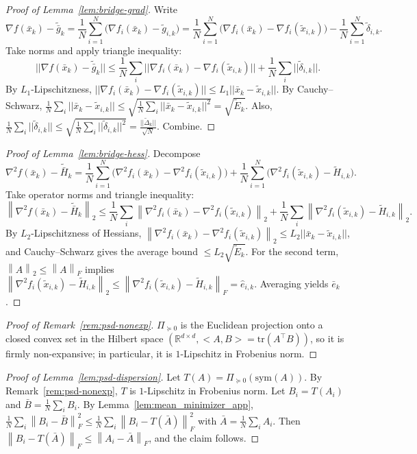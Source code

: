 \documentclass[11pt,a4paper]{article}
\def\norm#1{||#1||}%
\def\ip#1#2{<#1,#2>}%
\newcommand{\R}{\mathbb{R}}
\newcommand{\ip}[2]{\left\langle #1,#2\right\rangle}
\newcommand{\norm}[1]{\left\|#1\right\|}
\newcommand{\normtwo}[1]{\left\|#1\right\|_2}
\newcommand{\normF}[1]{\left\|#1\right\|_F}
\newcommand{\ProjPSD}{\Pi_{\succeq 0}}
\begin{document}
	
	\begin{proof}[Proof of Lemma~\ref{lem:bridge-grad}]
		Write
		\[
		\nabla f(\bar x_k)-\tilde{\bar g}_k
		=\frac1N\sum_{i=1}^N\big(\nabla f_i(\bar x_k)-\tilde g_{i,k}\big)
		=\frac1N\sum_{i=1}^N\big(\nabla f_i(\bar x_k)-\nabla f_i(\tilde x_{i,k})\big)
		-\frac1N\sum_{i=1}^N \tilde\delta_{i,k}.
		\]
		Take norms and apply triangle inequality:
		\[
		\norm{\nabla f(\bar x_k)-\tilde{\bar g}_k}
		\le \frac1N\sum_i\norm{\nabla f_i(\bar x_k)-\nabla f_i(\tilde x_{i,k})}
		+\frac1N\sum_i\norm{\tilde\delta_{i,k}}.
		\]
		By $L_1$-Lipschitzness,
		$\norm{\nabla f_i(\bar x_k)-\nabla f_i(\tilde x_{i,k})}\le L_1\norm{\bar x_k-\tilde x_{i,k}}$.
		By Cauchy--Schwarz,
		$\frac1N\sum_i\norm{\bar x_k-\tilde x_{i,k}}\le \sqrt{\frac1N\sum_i\norm{\bar x_k-\tilde x_{i,k}}^2}=\sqrt{\tilde E_k}$.
		Also,
		$\frac1N\sum_i\norm{\tilde\delta_{i,k}}\le \sqrt{\frac1N\sum_i\norm{\tilde\delta_{i,k}}^2}=\frac{\norm{\tilde\Delta_k}}{\sqrt N}$.
		Combine.
	\end{proof}
	
	\begin{proof}[Proof of Lemma~\ref{lem:bridge-hess}]
		Decompose
		\[
		\nabla^2 f(\bar x_k)-\tilde{\bar H}_k
		=\frac1N\sum_{i=1}^N\big(\nabla^2 f_i(\bar x_k)-\nabla^2 f_i(\tilde x_{i,k})\big)
		+\frac1N\sum_{i=1}^N\big(\nabla^2 f_i(\tilde x_{i,k})-\tilde H_{i,k}\big).
		\]
		Take operator norms and triangle inequality:
		\[
		\normtwo{\nabla^2 f(\bar x_k)-\tilde{\bar H}_k}
		\le \frac1N\sum_i\normtwo{\nabla^2 f_i(\bar x_k)-\nabla^2 f_i(\tilde x_{i,k})}
		+\frac1N\sum_i\normtwo{\nabla^2 f_i(\tilde x_{i,k})-\tilde H_{i,k}}.
		\]
		By $L_2$-Lipschitzness of Hessians,
		$\normtwo{\nabla^2 f_i(\bar x_k)-\nabla^2 f_i(\tilde x_{i,k})}\le L_2\norm{\bar x_k-\tilde x_{i,k}}$,
		and Cauchy--Schwarz gives the average bound $\le L_2\sqrt{\tilde E_k}$.
		For the second term, $\normtwo{A}\le \normF{A}$ implies
		$\normtwo{\nabla^2 f_i(\tilde x_{i,k})-\tilde H_{i,k}}\le \normF{\nabla^2 f_i(\tilde x_{i,k})-\tilde H_{i,k}}=\hat e_{i,k}$.
		Averaging yields $\bar e_k$.
	\end{proof}
	
	\begin{proof}[Proof of Remark~\ref{rem:psd-nonexp}]
		$\ProjPSD$ is the Euclidean projection onto a closed convex set in the Hilbert space $(\R^{d\times d},\ip{A}{B}=\mathrm{tr}(A^\top B))$,
		so it is firmly non-expansive; in particular, it is $1$-Lipschitz in Frobenius norm.
	\end{proof}
	
	\begin{proof}[Proof of Lemma~\ref{lem:psd-dispersion}]
		Let $T(A)=\ProjPSD(\mathrm{sym}(A))$. By Remark~\ref{rem:psd-nonexp}, $T$ is $1$-Lipschitz in Frobenius norm. Let $B_i=T(A_i)$ and $\bar B=\frac1N\sum_i B_i$. By Lemma~\ref{lem:mean_minimizer_app},
		$\frac1N\sum_i\normF{B_i-\bar B}^2\le \frac1N\sum_i\normF{B_i-T(\bar A)}^2$ with $\bar A=\frac1N\sum_i A_i$. Then $\normF{B_i-T(\bar A)}\le \normF{A_i-\bar A}$, and the claim follows.
	\end{proof}
	
\end{document}
